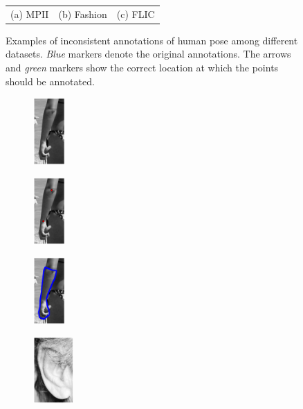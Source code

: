 \begin{figure}[t!]
\begin{tabular}{ccc}
        \\
        (a) MPII
        &
        (b) Fashion
        &
        (c) FLIC
        \end{tabular}
    \caption{Examples of inconsistent annotations of human pose among different datasets. \emph{Blue} markers denote the original annotations. The arrows and \emph{green} markers show the correct location at which the points should be annotated.}
    \label{fig:wrong_anno}
\end{figure} 
\begin{figure}[t!]
    \centering
    \begin{subfigure}[b]{0.065\textwidth}
            \includegraphics[height=2.55cm]{resources/Fig_Intro/intro_2_0}
    \end{subfigure}
    \hfill
    \begin{subfigure}[b]{0.065\textwidth}
            \includegraphics[height=2.55cm]{resources/Fig_Intro/intro_2_1}
    \end{subfigure}
    \hfill
    \begin{subfigure}[b]{0.065\textwidth}
            \includegraphics[height=2.55cm]{resources/Fig_Intro/intro_2_2}
    \end{subfigure}
    \hfill
    \begin{subfigure}[b]{0.085\textwidth}
            \includegraphics[height=2.55cm]{resources/Fig_Intro/intro_1_0}

\end{subfigure}
\end{figure}
